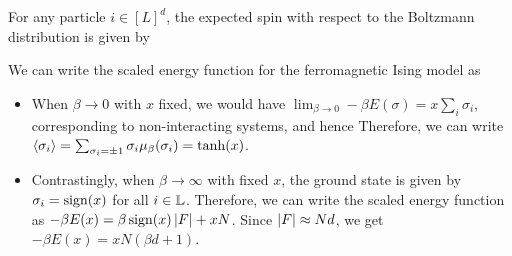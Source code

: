 \documentclass[letterpaper,english,10pt]{article}
\begin{document}
\begin{defn} 
 For any particle $i \in [L]^d$, the expected spin with respect to the Boltzmann distribution is given by 
 \end{defn}
 We can write the scaled energy function for the ferromagnetic Ising model as
\begin{itemize}
\item When $\beta \to 0$ with $x$ fixed, we would have $\lim_{\beta \to 0}-\beta E(\sigma) = x \sum_{i}\sigma_{i}$, 
corresponding to non-interacting systems, and hence 
Therefore, we can write $\left\langle\sigma_i\right\rangle = \sum_{\sigma_i = \pm 1}\sigma_i\mu_\beta(\sigma_i) = \tanh(x)$. 
\item Contrastingly, when $\beta \to \infty$ with fixed $x$, the ground state is given by $\sigma_i = \operatorname{sign}(x)$ for all $i \in \mathbb{L}$. 
Therefore, we can write the scaled energy function as $-\beta E(x) = \beta \operatorname{sign}(x)\left\lvert F\right\rvert+ xN$. 
Since $\left\lvert F\right\rvert \approx Nd$, we get $-\beta E(x) = xN(\beta d+ 1)$. 
\end{itemize}
\end{document}
